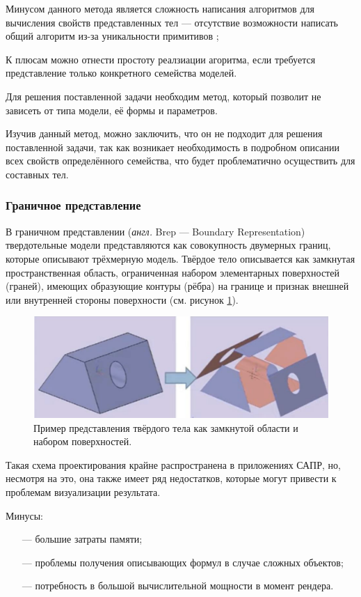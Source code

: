 Минусом данного метода является сложность написания алгоритмов для вычисления свойств представленных тел --- отсутствие возможности написать общий алгоритм из-за уникальности примитивов ;

К плюсам можно отнести простоту реалзиации агоритма, если требуется представление только конкретного семейства моделей. 

Для решения поставленной задачи необходим метод, который позволит 
не зависеть от типа модели, её формы и параметров.  

Изучив данный метод, можно заключить, что он не подходит для решения 
поставленной задачи, так как возникает необходимость в подробном описании 
всех свойств определённого семейства, что будет проблематично осуществить 
для составных тел.

\subsubsection{Граничное представление}
В граничном представлении (\textit{англ.} Brep --- Boundary Representation) твердотельные модели представляются как совокупность 
двумерных границ, которые описывают трёхмерную модель. 
Твёрдое тело описывается как замкнутая пространственная область, ограниченная набором элементарных поверхностей (граней), имеющих образующие контуры (рёбра) на границе и признак внешней или внутренней стороны поверхности (см. 
рисунок \ref{fig:brep}). \newpage

\begin{figure}[h]
	\centering
	\includegraphics[width=\textwidth]{img/brep.png}
	\caption{Пример представления твёрдого тела как замкнутой 
		области и набором поверхностей.}
	\label{fig:brep}
\end{figure}

Такая схема проектирования крайне распространена в приложениях 
САПР, но, несмотря на это, она также имеет ряд недостатков, которые могут 
привести к проблемам визуализации результата.

Минусы:
\begin{itemize}[leftmargin=1.6\parindent]
	\item[---] большие затраты памяти;
	\item[---] проблемы получения описывающих формул в случае сложных объектов;
	\item[---] потребность в большой вычислительной мощности в момент рендера.
\end{itemize}

